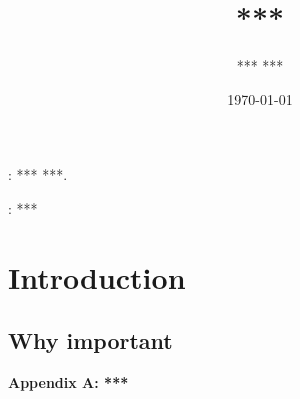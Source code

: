 \documentclass[12pt]{article}
\renewcommand{\theequation} {\arabic{section}.\arabic{equation}}
\begin{document}
\title
{\bf ****}
\author
{
*** *** \\
}
\date{\today}
\maketitle
\begin{abstract}

\end{abstract}

: *** ***.

: ***
\section{Introduction}





	

\subsection{Why important}

\setcounter{equation}{0}
\renewcommand{\theequation} {A.\arabic{equation}}
\begin{center}
\bf \Large Appendix A: ***
\end{center}






\end{document}
